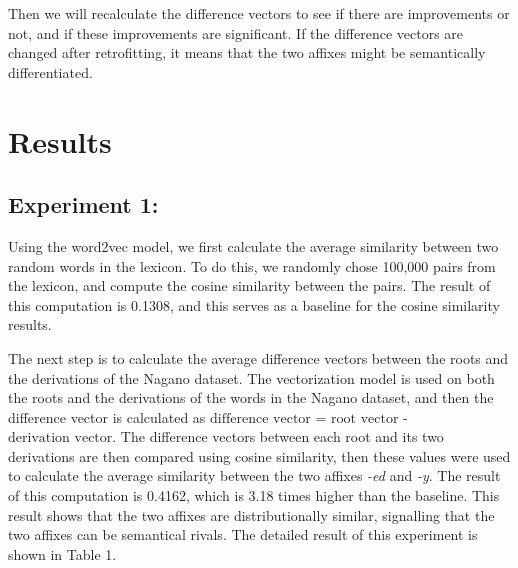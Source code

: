 \documentclass[12pt]{article}
\begin{document}
    Then we will recalculate the difference vectors to see if there are improvements or not, and if these improvements are significant. If the difference vectors are changed after retrofitting, it means that the two affixes might be semantically differentiated.

\section{Results}
    \subsection{Experiment 1:}
    Using the word2vec model, we first calculate the average similarity between two random words in the lexicon. To do this, we randomly chose 100,000 pairs from the lexicon, and compute the cosine similarity between the pairs. The result of this computation is 0.1308, and this serves as a baseline for the cosine similarity results. 

    The next step is to calculate the average difference vectors between the roots and the derivations of the Nagano dataset. The vectorization model is used on both the roots and the derivations of the words in the Nagano dataset, and then the difference vector is calculated as $\text{difference vector}$ = $\text{root vector}$ - $\text{derivation vector}$. The difference vectors between each root and its two derivations are then compared using cosine similarity, then these values were used to calculate the average similarity between the two affixes \emph{-ed} and \emph{-y}. The result of this computation is 0.4162, which is 3.18 times higher than the baseline. This result shows that the two affixes are distributionally similar, signalling that the two affixes can be semantical rivals. The detailed result of this experiment is shown in Table 1.
\end{document}
